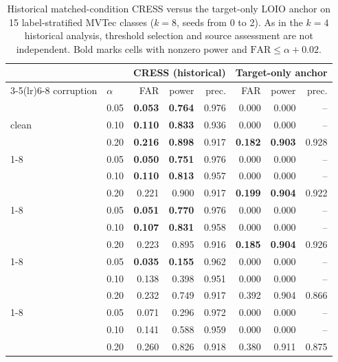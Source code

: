 \begin{table}[pos=t]
\centering
\caption{Historical matched-condition CRESS versus the target-only LOIO anchor on 15 label-stratified MVTec classes ($k{=}8$, seeds from 0 to 2). As in the $k{=}4$ historical analysis, threshold selection and source assessment are not independent. Bold marks cells with nonzero power and $\mathrm{FAR}\le\alpha{+}0.02$.}
\label{tab:sc3r-k8}
\footnotesize
\setlength{\tabcolsep}{3pt}
\begin{tabular}{llrrrrrr}
\toprule
 & & \multicolumn{3}{c}{CRESS (historical)} & \multicolumn{3}{c}{Target-only anchor} \\
\cmidrule(lr){3-5}\cmidrule(lr){6-8}
corruption & $\alpha$ & FAR & power & prec. & FAR & power & prec. \\
\midrule
\multirow{3}{*}{clean} & 0.05 & \textbf{0.053} & \textbf{0.764} & 0.976 & 0.000 & 0.000 & -- \\
 & 0.10 & \textbf{0.110} & \textbf{0.833} & 0.936 & 0.000 & 0.000 & -- \\
 & 0.20 & \textbf{0.216} & \textbf{0.898} & 0.917 & \textbf{0.182} & \textbf{0.903} & 0.928 \\
\cmidrule(lr){1-8}
\multirow{3}{*}{blur} & 0.05 & \textbf{0.050} & \textbf{0.751} & 0.976 & 0.000 & 0.000 & -- \\
 & 0.10 & \textbf{0.110} & \textbf{0.813} & 0.957 & 0.000 & 0.000 & -- \\
 & 0.20 & 0.221 & 0.900 & 0.917 & \textbf{0.199} & \textbf{0.904} & 0.922 \\
\cmidrule(lr){1-8}
\multirow{3}{*}{bright/contr.} & 0.05 & \textbf{0.051} & \textbf{0.770} & 0.976 & 0.000 & 0.000 & -- \\
 & 0.10 & \textbf{0.107} & \textbf{0.831} & 0.958 & 0.000 & 0.000 & -- \\
 & 0.20 & 0.223 & 0.895 & 0.916 & \textbf{0.185} & \textbf{0.904} & 0.926 \\
\cmidrule(lr){1-8}
\multirow{3}{*}{Gauss. noise} & 0.05 & \textbf{0.035} & \textbf{0.155} & 0.962 & 0.000 & 0.000 & -- \\
 & 0.10 & 0.138 & 0.398 & 0.951 & 0.000 & 0.000 & -- \\
 & 0.20 & 0.232 & 0.749 & 0.917 & 0.392 & 0.904 & 0.866 \\
\cmidrule(lr){1-8}
\multirow{3}{*}{JPEG} & 0.05 & 0.071 & 0.296 & 0.972 & 0.000 & 0.000 & -- \\
 & 0.10 & 0.141 & 0.588 & 0.959 & 0.000 & 0.000 & -- \\
 & 0.20 & 0.260 & 0.826 & 0.918 & 0.380 & 0.911 & 0.875 \\
\bottomrule
\end{tabular}
\end{table}
